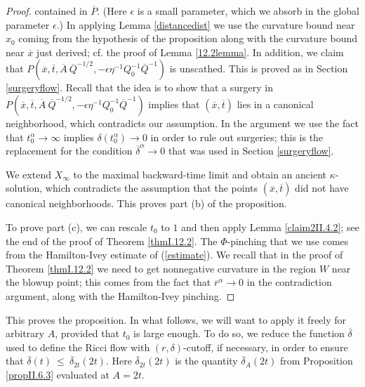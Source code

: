 \documentclass[12pt]{amsart}
\newcommand{\al}{\alpha}
\numberwithin{equation}{section}
\theoremstyle{plain}
\theoremstyle{definition}
\theoremstyle{remark}
\begin{document}
\begin{proof}
contained in $\overline{P}$. 
(Here $\epsilon$ is a small parameter, which we absorb in the
global parameter $\epsilon$.)
In applying Lemma \ref{distancedist} we use the curvature
bound near $x_0$ coming from the hypothesis of the proposition along with 
the curvature bound near $\overline{x}$ just derived; cf. the proof
of Lemma \ref{12.2lemma}.
In addition, we claim that 
$P(\overline{x}, \overline{t}, \overline{A} \: \overline{Q}^{-1/2},
- \epsilon \eta^{-1} Q_0^{-1} \overline{Q}^{-1})$ is
unscathed. This is proved as in Section \ref{surgeryflow}.
Recall that the idea is to show that a surgery in
$P(\overline{x}, \overline{t}, \overline{A} \: \overline{Q}^{-1/2},
- \epsilon \eta^{-1} Q_0^{-1} \overline{Q}^{-1})$ implies that
$(\overline{x}, \overline{t})$ lies in a canonical neighborhood,
which contradicts our assumption. In the argument
we use the fact that $t_0^\al \rightarrow \infty$
implies $\delta(t_0^\al) \rightarrow 0$ in order to rule out
surgeries; this is the replacement for the condition
$\overline{\delta}^{\alpha} \rightarrow 0$ that was used in
Section \ref{surgeryflow}.


We extend $X_\infty$ to the maximal backward-time limit and
obtain an ancient $\kappa$-solution, which contradicts the assumption
that the points $(\overline{x}, \overline{t})$ did not have
canonical neighborhoods. This proves part (b) of the proposition.

To prove part (c), 
we can rescale $t_0$ to $1$ and then apply
Lemma \ref{claim2II.4.2}; see the end of the proof of Theorem 
\ref{thmI.12.2}. 
The $\Phi$-pinching that we use comes from the Hamilton-Ivey
estimate of (\ref{estimate}).
We recall that in the proof of Theorem \ref{thmI.12.2}
we need to get nonnegative curvature in the region $W$ near the
blowup point;
this comes from the fact that $\overline{r}^\al \rightarrow 0$ in the
contradiction argument, along with the Hamilton-Ivey pinching.
\end{proof}

This proves the proposition.
In what follows, we will want to apply it freely for arbitrary
$A$, provided that $t_0$ is large enough. To do so,
we reduce the function $\overline{\delta}$ used to define the
Ricci flow with $(r, \delta)$-cutoff, if necessary, in order to ensure
that $\overline{\delta}(t) \: \le \: \overline{\delta}_{2t}(2t)$.
Here $\overline{\delta}_{2t}(2t)$ is the quantity
$\overline{\delta}_{A}(2t)$ from Proposition \ref{propII.6.3} 
evaluated at $A = 2t$. 
\end{document}
